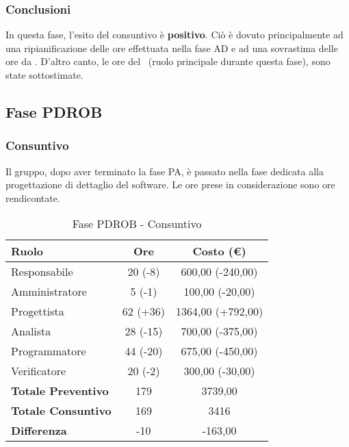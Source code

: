 \documentclass[../PianoProgetto.tex]{subfiles}
\begin{document}
	\subsubsection{Conclusioni}	
     In questa fase, l'esito del consuntivo è \textbf{positivo}. 
     Ciò è dovuto principalmente ad una ripianificazione delle ore effettuata nella fase AD e ad una sovrastima delle ore da \analista. D'altro canto, le ore del \progettista\ (ruolo principale durante questa fase), sono state sottostimate.
     
	\subsection{Fase PDROB}
	\subsubsection{Consuntivo}
	Il gruppo, dopo aver terminato la fase PA, è passato nella fase dedicata alla progettazione di dettaglio del software\g. Le ore prese in considerazione sono ore rendicontate. 
	
	\begin{table}[h]
		\centering
		\begin{tabular}{l * {2}{c}}
			\toprule
			\textbf{Ruolo} & \textbf{Ore} & \textbf{Costo (\euro{})} \\
			\midrule
			Responsabile &		20 (-8) & 600,00  (-240,00) \\
			Amministratore &	5 (-1) & 100,00  (-20,00) \\
			Progettista & 		62 (+36) & 1364,00  (+792,00)\\
			Analista & 			28	(-15)	& 700,00   (-375,00)       \\
			Programmatore & 	44	(-20)	& 675,00 	(-450,00)			\\
			Verificatore & 		20 (-2) & 300,00 (-30,00)	\\
			\midrule
			\textbf{Totale Preventivo} & 179
			& 3739,00
			\\		
			\textbf{Totale Consuntivo} & 169 & 3416 
			\\
			\midrule
			\textbf{Differenza} & -10 & -163,00 \\
			\bottomrule
		\end{tabular}
		
		\caption{Fase PDROB - Consuntivo}
		\label{tab:consuntivoPDROB}
		
	\end{table}	
	
\end{document}
